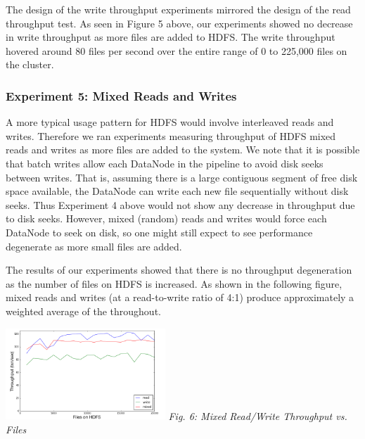 \documentclass[11pt, a4paper]{article}
\begin{document}
\begin{multicols*}{2}
The design of the write throughput experiments mirrored the design of the read throughput test. As seen in Figure 5 above, our experiments showed no decrease in write throughput as more files are added to HDFS. The write throughput hovered around 80 files per second over the entire range of 0 to 225,000 files on the cluster.

\subsubsection{Experiment 5: Mixed Reads and Writes}\label{ReadWriteThroughput}
A more typical usage pattern for HDFS would involve interleaved reads and writes. Therefore we ran experiments measuring throughput of HDFS mixed reads and writes as more files are added to the system. We note that it is possible that batch writes allow each DataNode in the pipeline to avoid disk seeks between writes. That is, assuming there is a large contiguous segment of free disk space available, the DataNode can write each new file sequentially without disk seeks. Thus Experiment 4 above would not show any decrease in throughput due to disk seeks. However, mixed (random) reads and writes would force each DataNode to seek on disk, so one might still expect to see performance degenerate as more small files are added.

The results of our experiments showed that there is no throughput degeneration as the number of files on HDFS is increased. As shown in the following figure, mixed reads and writes (at a read-to-write ratio of 4:1) produce approximately a weighted average of the throughout.
\begin{center}
	\includegraphics[keepaspectratio=true, width=0.45\textwidth]{MixedThroughput}
	\textit{Fig. 6: Mixed Read/Write Throughput vs. Files}
\end{center}


\end{multicols*}
\end{document}
